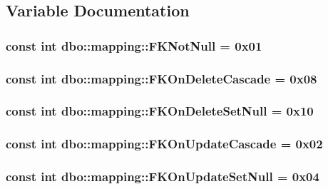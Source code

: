 \subsection{Variable Documentation}
\hypertarget{namespacedbo_1_1mapping_a524c2de86b4169d431af199d866f8331}{
\subsubsection[{F\+K\+Not\+Null}]{\setlength{\rightskip}{0pt plus 5cm}const int dbo\+::mapping\+::\+F\+K\+Not\+Null = 0x01}}\label{namespacedbo_1_1mapping_a524c2de86b4169d431af199d866f8331}
\hypertarget{namespacedbo_1_1mapping_af0f560be1c6628c4332af57fd0a9890e}{
\subsubsection[{F\+K\+On\+Delete\+Cascade}]{\setlength{\rightskip}{0pt plus 5cm}const int dbo\+::mapping\+::\+F\+K\+On\+Delete\+Cascade = 0x08}}\label{namespacedbo_1_1mapping_af0f560be1c6628c4332af57fd0a9890e}
\hypertarget{namespacedbo_1_1mapping_ab82b6560e26b4e5d430a4c250bd9ff24}{
\subsubsection[{F\+K\+On\+Delete\+Set\+Null}]{\setlength{\rightskip}{0pt plus 5cm}const int dbo\+::mapping\+::\+F\+K\+On\+Delete\+Set\+Null = 0x10}}\label{namespacedbo_1_1mapping_ab82b6560e26b4e5d430a4c250bd9ff24}
\hypertarget{namespacedbo_1_1mapping_a49684099001aa562bd3f41e20d9130ca}{
\subsubsection[{F\+K\+On\+Update\+Cascade}]{\setlength{\rightskip}{0pt plus 5cm}const int dbo\+::mapping\+::\+F\+K\+On\+Update\+Cascade = 0x02}}\label{namespacedbo_1_1mapping_a49684099001aa562bd3f41e20d9130ca}
\hypertarget{namespacedbo_1_1mapping_a382d00e9ad29bb1d14533bf44579ed9b}{
\subsubsection[{F\+K\+On\+Update\+Set\+Null}]{\setlength{\rightskip}{0pt plus 5cm}const int dbo\+::mapping\+::\+F\+K\+On\+Update\+Set\+Null = 0x04}}\label{namespacedbo_1_1mapping_a382d00e9ad29bb1d14533bf44579ed9b}
